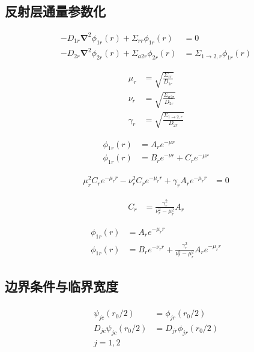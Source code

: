 \subsection{反射层通量参数化}

\begin{align}
    -D_{1r}\pmb{\nabla}^2\phi_{1r}(r) + \Sigma_{rr}\phi_{1r}(r) &= 0 \\
    -D_{2r}\pmb{\nabla}^2\phi_{2r}(r) + \Sigma_{a2r}\phi_{2r}(r) &= \Sigma_{1\rightarrow 2,r}\phi_{1r}(r)
\end{align}

\begin{align}
    \mu_r &= \sqrt{\frac{\Sigma_{rr}}{D_{1r}}} \\
    \nu_r &= \sqrt{\frac{\Sigma_{a2r}}{D_{2r}}} \\
    \gamma_r &= \sqrt{\frac{\Sigma_{1\rightarrow 2,r}}{D_{2r}}}
\end{align}

\begin{align}
    \phi_{1r}(r) &= A_r e^{-\mu r} \\
    \phi_{1r}(r) &= B_r e^{-\nu r} + C_r e^{-\mu r}
\end{align}

\begin{align}
    \mu_r^2 C_r e^{-\mu_r r} - \nu_r^2 C_r e^{-\mu_r r} + \gamma_r A_r e^{-\mu_r r} &= 0
\end{align}

\begin{align}
    C_r &= \frac{\gamma_r^2}{\nu_r^2 - \mu_r^2}A_r
\end{align}

\begin{align}
    \phi_{1r}(r) &= A_r e^{-\mu_r r} \\
    \phi_{1r}(r) &= B_r e^{-\nu_r r} + \frac{\gamma_r^2}{\nu_r^2 - \mu_r^2}A_r e^{-\mu_r r}
\end{align}

\subsection{边界条件与临界宽度}

\begin{align}
    \begin{split}
        \psi_{jc}(r_0 / 2) &= \phi_{jr}(r_0 / 2) \\
        D_{jc}\psi_{jc}(r_0 / 2) &= D_{jr}\phi_{jr}(r_0 / 2) \\
        j = 1,2
    \end{split}
\end{align}

